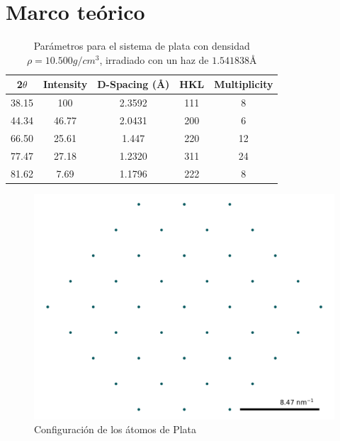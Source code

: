 \documentclass[reprint,amsmath,amssymb,aps,]{revtex4-2}
\begin{document}
\section{Marco teórico}
\begin{table}[H]
    \centering
    \begin{tabular}{ccccc}\hline
        2$\theta$ & Intensity & D-Spacing (\r{A}) & HKL & Multiplicity\\ \hline
        38.15 & 100 & 2.3592 & 111 & 8 \\
        44.34 & 46.77 & 2.0431 & 200 & 6 \\
        66.50 & 25.61 & 1.447 & 220 & 12 \\
        77.47 & 27.18 & 1.2320 & 311 & 24 \\
        81.62 & 7.69 & 1.1796 & 222 & 8 \\ \hline
    \end{tabular}
    \caption{Parámetros para el sistema de plata con densidad $\rho=10.500 g/cm^{3}$, irradiado con un haz de $1.541838$\r{A}}
    \label{tabla:parametros}
\end{table}
\begin{figure}[H]
    \centering
    \includegraphics[scale=0.4]{../Graphics/inicial.png}
    \caption{Configuración de los átomos de Plata}
    \label{fig:inicial}
\end{figure}
\end{document}
